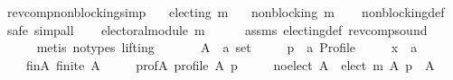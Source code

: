 \begin{isabellebody}
\ rev{\isacharunderscore}{\kern0pt}comp{\isacharunderscore}{\kern0pt}non{\isacharunderscore}{\kern0pt}blocking{\isacharbrackleft}{\kern0pt}simp{\isacharbrackright}{\kern0pt}{\isacharcolon}{\kern0pt}\isanewline
\ \ \ {\isachardoublequoteopen}electing\ m{\isachardoublequoteclose}\isanewline
\ \ \ {\isachardoublequoteopen}non{\isacharunderscore}{\kern0pt}blocking\ {\isacharparenleft}{\kern0pt}m{\isasymdown}{\isacharparenright}{\kern0pt}{\isachardoublequoteclose}\isanewline
%
\isadelimproof
\ \ %
\endisadelimproof
%
\isatagproof
{}\isamarkupfalse%
\ non{\isacharunderscore}{\kern0pt}blocking{\isacharunderscore}{\kern0pt}def\isanewline
{}\isamarkupfalse%
\ {\isacharparenleft}{\kern0pt}safe{\isacharcomma}{\kern0pt}\ simp{\isacharunderscore}{\kern0pt}all{\isacharparenright}{\kern0pt}\isanewline
\ \ \isamarkupfalse%
\ {\isachardoublequoteopen}electoral{\isacharunderscore}{\kern0pt}module\ {\isacharparenleft}{\kern0pt}m{\isasymdown}{\isacharparenright}{\kern0pt}{\isachardoublequoteclose}\isanewline
\ \ \ \ \isamarkupfalse%
\ assms\ electing{\isacharunderscore}{\kern0pt}def\ rev{\isacharunderscore}{\kern0pt}comp{\isacharunderscore}{\kern0pt}sound\isanewline
\ \ \ \ \isamarkupfalse%
\ {\isacharparenleft}{\kern0pt}metis\ {\isacharparenleft}{\kern0pt}no{\isacharunderscore}{\kern0pt}types{\isacharcomma}{\kern0pt}\ lifting{\isacharparenright}{\kern0pt}{\isacharparenright}{\kern0pt}\isanewline
{}\isamarkupfalse%
\isanewline
\ \ \isamarkupfalse%
\isanewline
\ \ \ \ A\ {\isacharcolon}{\kern0pt}{\isacharcolon}{\kern0pt}\ {\isachardoublequoteopen}{\isacharprime}{\kern0pt}a\ set{\isachardoublequoteclose}\ \isanewline
\ \ \ \ p\ {\isacharcolon}{\kern0pt}{\isacharcolon}{\kern0pt}\ {\isachardoublequoteopen}{\isacharprime}{\kern0pt}a\ Profile{\isachardoublequoteclose}\ \isanewline
\ \ \ \ x\ {\isacharcolon}{\kern0pt}{\isacharcolon}{\kern0pt}\ {\isachardoublequoteopen}{\isacharprime}{\kern0pt}a{\isachardoublequoteclose}\isanewline
\ \ \isamarkupfalse%
\isanewline
\ \ \ \ fin{\isacharunderscore}{\kern0pt}A{\isacharcolon}{\kern0pt}\ {\isachardoublequoteopen}finite\ A{\isachardoublequoteclose}\ \isanewline
\ \ \ \ prof{\isacharunderscore}{\kern0pt}A{\isacharcolon}{\kern0pt}\ {\isachardoublequoteopen}profile\ A\ p{\isachardoublequoteclose}\ \isanewline
\ \ \ \ no{\isacharunderscore}{\kern0pt}elect{\isacharcolon}{\kern0pt}\ {\isachardoublequoteopen}A\ {\isacharminus}{\kern0pt}\ elect\ m\ A\ p\ {\isacharequal}{\kern0pt}\ A{\isachardoublequoteclose}\ \isanewline

\end{isabellebody}
